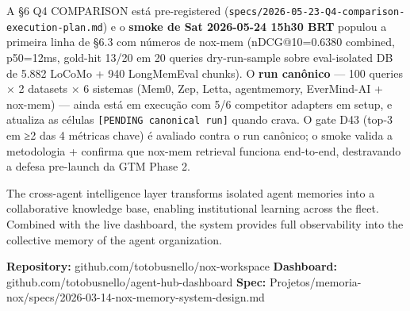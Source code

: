 \documentclass[
]{article}
\begin{document}
A §6 Q4 COMPARISON está pre-registered
(\texttt{specs/2026-05-23-Q4-comparison-execution-plan.md}) e o
\textbf{smoke de Sat 2026-05-24 15h30 BRT} populou a primeira linha de
§6.3 com números de nox-mem (nDCG@10=0.6380 combined, p50=12ms, gold-hit
13/20 em 20 queries dry-run-sample sobre eval-isolated DB de 5.882
LoCoMo + 940 LongMemEval chunks). O \textbf{run canônico} --- 100
queries × 2 datasets × 6 sistemas (Mem0, Zep, Letta, agentmemory,
EverMind-AI + nox-mem) --- ainda está em execução com 5/6 competitor
adapters em setup, e atualiza as células
\texttt{{[}PENDING\ canonical\ run{]}} quando crava. O gate D43 (top-3
em ≥2 das 4 métricas chave) é avaliado contra o run canônico; o smoke
valida a metodologia + confirma que nox-mem retrieval funciona
end-to-end, destravando a defesa pre-launch da GTM Phase 2.

The cross-agent intelligence layer transforms isolated agent memories
into a collaborative knowledge base, enabling institutional learning
across the fleet. Combined with the live dashboard, the system provides
full observability into the collective memory of the agent organization.

\textbf{Repository:} github.com/totobusnello/nox-workspace
\textbf{Dashboard:} github.com/totobusnello/agent-hub-dashboard
\textbf{Spec:}
Projetos/memoria-nox/specs/2026-03-14-nox-memory-system-design.md
\end{document}

